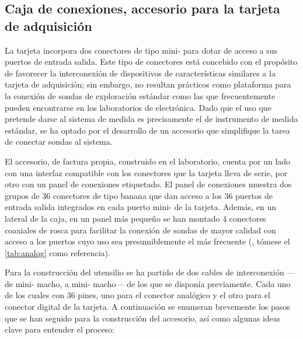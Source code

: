 \subsection{Caja de conexiones, accesorio para la tarjeta de
adquisición}\label{subsec:conbox}

La tarjeta \kpci{} incorpora dos conectores de tipo mini- para dotar
de acceso a sus puertos de entrada salida. Este tipo de conectores está
concebido con el propósito de favorecer la interconexión de dispositivos de
características similares a la tarjeta de adquisición; sin embargo, no
resultan prácticos como plataforma para la conexión de sondas de
exploración estándar como las que frecuentemente pueden encontrarse en los
laboratorios de electrónica. Dado que el uso que pretende darse al sistema
de medida es precisamente el de instrumento de medida estándar, se ha
optado por el desarrollo de un accesorio que simplifique la tarea de
conectar sondas al sistema.

El accesorio, de factura propia, construido en el laboratorio, cuenta por
un lado con una interfaz compatible con los conectores que la tarjeta lleva
de serie, por otro con un panel de conexiones etiquetado. El panel de
conexiones muestra dos grupos de 36 conectores de tipo banana que dan
acceso a los 36 puertos de entrada salida integrados en cada puerto
mini- de la tarjeta. Además, en un lateral de la caja, en un panel
más pequeño se han montado 4 conectores coaxiales de rosca para facilitar
la conexión de sondas de mayor calidad con acceso a los puertos cuyo uso
sea presumiblemente el más frecuente (, tómese
el \cref{tab:analog} como referencia).

Para la construcción del utensilio se ha partido de dos cables de
interconexión ---de mini- macho, a mini- macho--- de los que
se disponía previamente. Cada uno de los cuales con 36 pines, uno para el
conector analógico y el otro para el conector digital de la tarjeta. A
continuación se enumeran brevemente los pasos que se han seguido para la
construcción del accesorio, así como algunas ideas clave para entender el
proceso:


